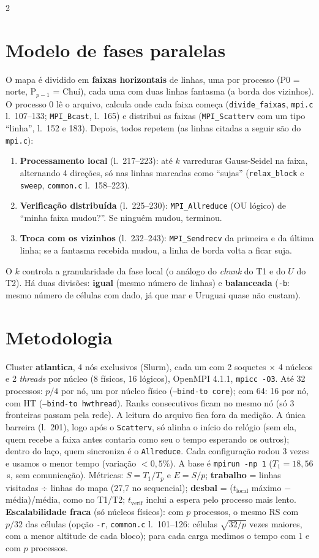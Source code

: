 \documentclass[9pt,a4paper]{extarticle}
\newcommand{\tl}{t_{\mathrm{local}}}
\begin{document}
\begin{multicols}{2}
\section{Modelo de fases paralelas}
O mapa é dividido em \textbf{faixas horizontais} de linhas, uma por processo (P0 = norte, P$_{p-1}$ = Chuí), cada uma com duas linhas fantasma (a borda dos vizinhos). O processo 0 lê o arquivo, calcula onde cada faixa começa (\texttt{divide\_faixas}, \texttt{mpi.c} l.~107--133; \texttt{MPI\_Bcast}, l.~165) e distribui as faixas (\texttt{MPI\_Scatterv} com um tipo ``linha'', l.~152 e 183). Depois, todos repetem (as linhas citadas a seguir são do \texttt{mpi.c}):
\begin{enumerate}
\item \textbf{Processamento local} (l.~217--223): até $k$ varreduras Gauss-Seidel na faixa, alternando 4 direções, só nas linhas marcadas como ``sujas'' (\texttt{relax\_block} e \texttt{sweep}, \texttt{common.c} l.~158--223).
\item \textbf{Verificação distribuída} (l.~225--230): \texttt{MPI\_Allreduce} (OU lógico) de ``minha faixa mudou?''. Se ninguém mudou, terminou.
\item \textbf{Troca com os vizinhos} (l.~232--243): \texttt{MPI\_Sendrecv} da primeira e da última linha; se a fantasma recebida mudou, a linha de borda volta a ficar suja.
\end{enumerate}
O $k$ controla a granularidade da fase local (o análogo do \emph{chunk} do T1 e do $U$ do T2). Há duas divisões: \textbf{igual} (mesmo número de linhas) e \textbf{balanceada} (\texttt{-b}: mesmo número de células com dado, já que mar e Uruguai quase não custam).

\section{Metodologia}
Cluster \textbf{atlantica}, 4 nós exclusivos (Slurm), cada um com 2 soquetes $\times$ 4 núcleos e 2 \emph{threads} por núcleo (8 físicos, 16 lógicos), OpenMPI 4.1.1, \texttt{mpicc -O3}. Até 32 processos: $p/4$ por nó, um por núcleo físico (\texttt{--bind-to core}); com 64: 16 por nó, com HT (\texttt{--bind-to hwthread}). Ranks consecutivos ficam no mesmo nó (só 3 fronteiras passam pela rede). A leitura do arquivo fica fora da medição. A única barreira (l.~201), logo após o \texttt{Scatterv}, só alinha o início do relógio (sem ela, quem recebe a faixa antes contaria como seu o tempo esperando os outros); dentro do laço, quem sincroniza é o \texttt{Allreduce}. Cada configuração rodou 3 vezes e usamos o menor tempo (variação $<0{,}5\%$). A base é \texttt{mpirun -np 1} ($T_1 = 18{,}56$\,s, sem comunicação). Métricas: $S=T_1/T_p$ e $E=S/p$; \textbf{trabalho} = linhas visitadas $\div$ linhas do mapa (27,7 no sequencial); \textbf{desbal} = ($\tl$ máximo $-$ média)/média, como no T1/T2; $t_{\mathrm{verif}}$ inclui a espera pelo processo mais lento. \textbf{Escalabilidade fraca} (só núcleos físicos): com $p$ processos, o mesmo RS com $p/32$ das células (opção \texttt{-r}, \texttt{common.c} l.~101--126: células $\sqrt{32/p}$ vezes maiores, com a menor altitude de cada bloco); para cada carga medimos o tempo com 1 e com $p$ processos.


\end{multicols}
\end{document}
